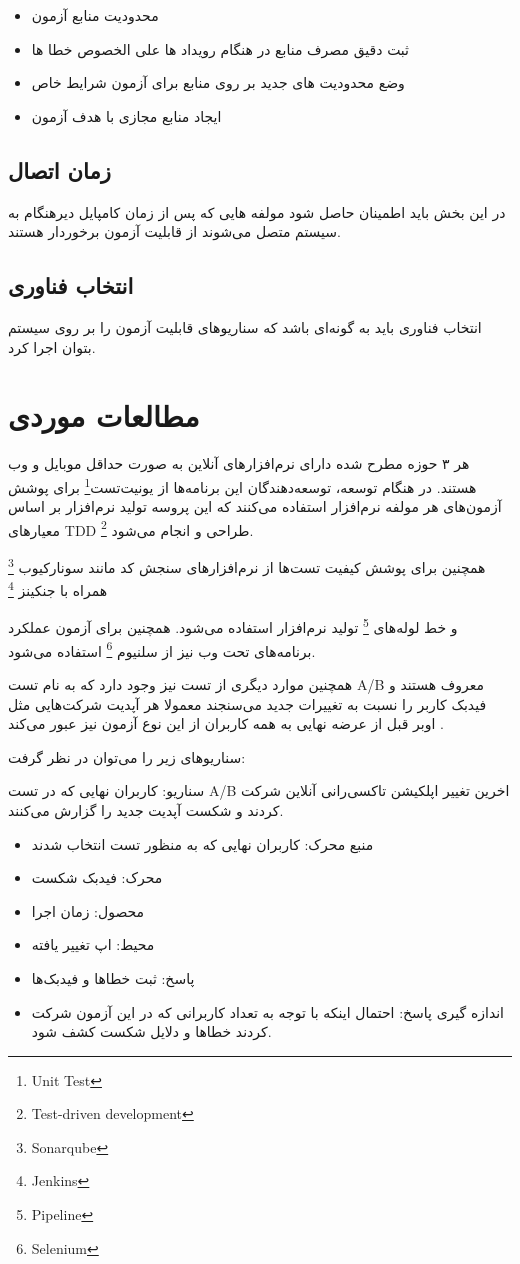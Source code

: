 \begin{itemize}
\item
محدودیت منابع آزمون
\item
ثبت دقیق مصرف منابع در هنگام رویداد ها علی الخصوص خطا ها
\item
وضع محدودیت های جدید بر روی منابع برای آزمون شرایط خاص
\item
ایجاد منابع مجازی با هدف آزمون
\end{itemize}
\subsection{زمان اتصال}
در این بخش باید اطمینان حاصل شود مولفه هایی که پس از زمان کامپایل دیرهنگام به سیستم متصل می‌شوند از قابلیت آزمون برخوردار هستند.
\subsection{انتخاب فناوری}
انتخاب فناوری باید به گونه‌ای باشد که سناریو‌های قابلیت آزمون را بر روی سیستم بتوان اجرا کرد.



\section{مطالعات موردی}
هر ۳ حوزه مطرح شده دارای نرم‌افزارهای آنلاین به صورت حداقل موبایل و وب هستند. در هنگام توسعه، توسعه‌دهندگان این برنامه‌ها از یونیت‌تست\footnote{Unit Test}
برای پوشش آزمون‌های هر مولفه نرم‌افزار استفاده می‌کنند که این پروسه تولید نرم‌افزار بر اساس معیارهای TDD \footnote{Test-driven development} طراحی و انجام می‌شود.

همچنین برای پوشش کیفیت تست‌ها از نرم‌افزارهای سنجش کد مانند سونارکیوب
\footnote{Sonarqube}
همراه با جنکینز
\footnote{Jenkins} 

و خط لوله‌های
\footnote{Pipeline}
تولید نرم‌افزار استفاده می‌شود.
همچنین برای آزمون عملکرد برنامه‌های تحت وب نیز از سلنیوم 
\footnote{Selenium}
استفاده می‌شود.

همچنین موارد دیگری از تست نیز وجود دارد که به نام تست A/B معروف هستند و فیدبک کاربر را نسبت به تغییرات جدید می‌سنجند معمولا هر آپدیت شرکت‌هایی مثل اوبر قبل از عرضه نهایی به همه کاربران از این نوع آزمون نیز عبور می‌کند \cite{uber_test}.

سناریو‌های زیر را می‌توان در نظر گرفت:

سناریو: کاربران نهایی که در تست A/B  اخرین تغییر اپلکیشن تاکسی‌رانی آنلاین شرکت کردند و شکست آپدیت جدید را گزارش می‌کنند.
\begin{itemize}
\item
منبع محرک: کاربران نهایی که به منظور تست انتخاب شدند
\item
محرک: فیدبک شکست
\item
محصول: زمان اجرا
\item
محیط: اپ تغییر یافته
\item
پاسخ: ثبت خطاها و فیدبک‌ها 
\item
اندازه گیری پاسخ: احتمال اینکه با توجه به تعداد کاربرانی که در این آزمون شرکت کردند خطاها و دلایل شکست کشف شود. 
\end{itemize}


